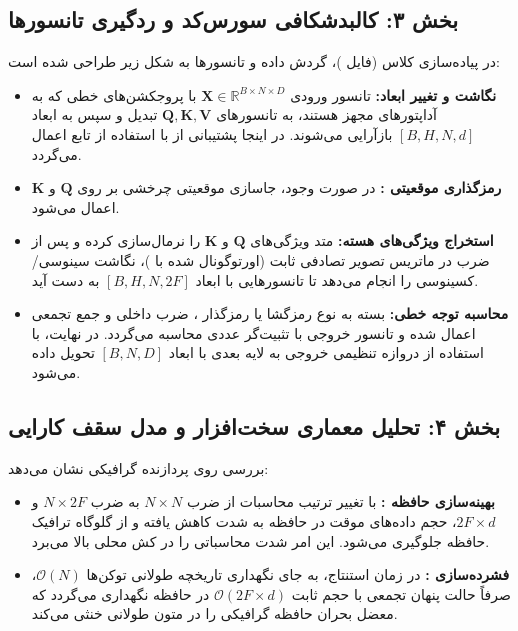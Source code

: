 \subsection*{بخش ۳: کالبدشکافی سورس‌کد و ردگیری تانسورها }
در پیاده‌سازی کلاس  (فایل )، گردش داده و تانسورها به شکل زیر طراحی شده است:
\begin{itemize}
\item \textbf{نگاشت و تغییر ابعاد:} تانسور ورودی $\mathbf{X} \in \mathbb{R}^{B \times N \times D}$ با پروجکشن‌های خطی که به آداپتورهای  مجهز هستند، به تانسورهای $\mathbf{Q}, \mathbf{K}, \mathbf{V}$ تبدیل و سپس به ابعاد $[B, H, N, d]$ بازآرایی می‌شوند. در اینجا پشتیبانی از   با استفاده از تابع  اعمال می‌گردد.
\item \textbf{رمزگذاری موقعیتی :} در صورت وجود، جاسازی موقعیتی چرخشی  بر روی $\mathbf{Q}$ و $\mathbf{K}$ اعمال می‌شود.
\item \textbf{استخراج ویژگی‌های هسته:} متد  ویژگی‌های $\mathbf{Q}$ و $\mathbf{K}$ را نرمال‌سازی کرده و پس از ضرب در ماتریس تصویر تصادفی  ثابت (اورتوگونال شده با )، نگاشت سینوسی/کسینوسی را انجام می‌دهد تا تانسورهایی با ابعاد $[B, H, N, 2F]$ به دست آید.
\item \textbf{محاسبه توجه خطی:} بسته به نوع رمزگشا  یا رمزگذار ، ضرب داخلی و جمع تجمعی اعمال شده و تانسور خروجی  با تثبیت‌گر عددی  محاسبه می‌گردد. در نهایت، با استفاده از دروازه تنظیمی  خروجی به لایه بعدی با ابعاد $[B, N, D]$ تحویل داده می‌شود.
\end{itemize}

\subsection*{بخش ۴: تحلیل معماری سخت‌افزار و مدل سقف کارایی }
بررسی روی پردازنده گرافیکی  نشان می‌دهد:
\begin{itemize}
\item \textbf{بهینه‌سازی حافظه :} با تغییر ترتیب محاسبات از ضرب $N \times N$ به ضرب $N \times 2F$ و $2F \times d$، حجم داده‌های موقت در حافظه به شدت کاهش یافته و از گلوگاه ترافیک حافظه  جلوگیری می‌شود. این امر شدت محاسباتی  را در کش محلی   بالا می‌برد.
\item \textbf{فشرده‌سازی :} در زمان استنتاج، به جای نگهداری تاریخچه طولانی توکن‌ها $\mathcal{O}(N)$، صرفاً حالت پنهان تجمعی با حجم ثابت $\mathcal{O}(2F \times d)$ در حافظه  نگهداری می‌گردد که معضل بحران حافظه گرافیکی را در متون طولانی خنثی می‌کند.
\end{itemize}

